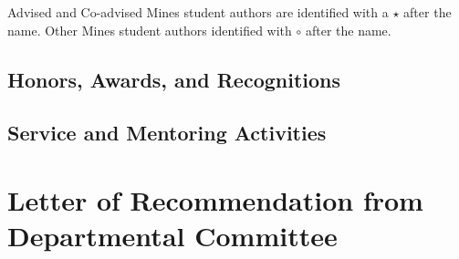 \documentclass[letterpaper,12pt,times]{article}
\newcommand{\sectionname}[0]{}
\renewcommand\thesection{\arabic{section}.}
\newif\ifinstr
\newcommand{\instr}[1]{
  \ifinstr
    \begin{leftbar}%
      \begin{color}{ColoradoRed}%
        \itshape
        \noindent%
        \ignorespaces%
        #1
      \end{color}
    \end{leftbar}%
  \else
  \fi
}
\begin{document}
Advised and Co-advised Mines student authors are identified with a
$\star$ after the name.  Other Mines student authors identified with
$\circ$ after the name.



\subsection{Honors, Awards, and Recognitions}


\instr{
  Provide information on any honors, awards and recognitions received
  both internal and external to Mines.
}


\subsection{Service and Mentoring Activities}

\instr{
  Provide here a list of service and/or mentoring activities done by
  the faculty member in support of the Department, Mines, and/or
  external professional organizations. This should include:

  \begin{itemize}
    \item National and international committees, editorial boards, panels, review teams, etc.
    \item Departmental and campus committees, graduate student
      committees, junior faculty mentoring, assessment activities,
      accreditation activities, student engagement and retention
      activities, student group advising, activities in partnership
      with Student Life, etc.
    \item Professional societies
    \item Outreach activities
    \item Organizing conferences, sessions, workshops, etc.
  \end{itemize}
}



\clearpage
\section{Letter of Recommendation from Departmental Committee}
\rhead{\thesection{} \sectionname}
\end{document}
